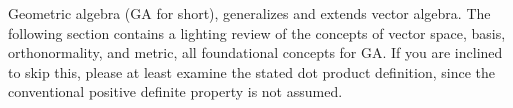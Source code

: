 %
%
Geometric algebra (GA for short), generalizes and extends vector algebra.  
The following section contains a lighting review of the 
concepts of vector space, basis, orthonormality, and metric, all foundational concepts for GA.
If you are inclined to skip this, please at least examine the
stated dot product definition, since the conventional positive definite property is not assumed.

